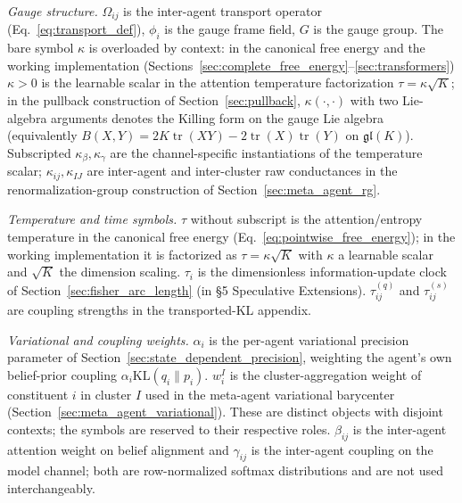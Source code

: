\documentclass[11pt]{article}
\begin{document}
\emph{Gauge structure.} $\Omega_{ij}$ is the inter-agent transport operator (Eq.~\ref{eq:transport_def}), $\phi_i$ is the gauge frame field, $G$ is the gauge group. The bare symbol $\kappa$ is overloaded by context: in the canonical free energy and the working implementation (Sections~\ref{sec:complete_free_energy}--\ref{sec:transformers}) $\kappa > 0$ is the learnable scalar in the attention temperature factorization $\tau = \kappa\sqrt{K}$; in the pullback construction of Section~\ref{sec:pullback}, $\kappa(\cdot,\cdot)$ with two Lie-algebra arguments denotes the Killing form on the gauge Lie algebra (equivalently $B(X,Y) = 2K\operatorname{tr}(XY) - 2\operatorname{tr}(X)\operatorname{tr}(Y)$ on $\mathfrak{gl}(K)$). Subscripted $\kappa_\beta, \kappa_\gamma$ are the channel-specific instantiations of the temperature scalar; $\kappa_{ij}, \kappa_{IJ}$ are inter-agent and inter-cluster raw conductances in the renormalization-group construction of Section~\ref{sec:meta_agent_rg}.

\emph{Temperature and time symbols.} $\tau$ without subscript is the attention/entropy temperature in the canonical free energy (Eq.~\ref{eq:pointwise_free_energy}); in the working implementation it is factorized as $\tau = \kappa \sqrt{K}$ with $\kappa$ a learnable scalar and $\sqrt{K}$ the dimension scaling. $\tau_i$ is the dimensionless information-update clock of Section~\ref{sec:fisher_arc_length} (in §5 Speculative Extensions). $\tau^{(q)}_{ij}$ and $\tau^{(s)}_{ij}$ are coupling strengths in the transported-KL appendix.

\emph{Variational and coupling weights.} $\alpha_i$ is the per-agent variational precision parameter of Section~\ref{sec:state_dependent_precision}, weighting the agent's own belief-prior coupling $\alpha_i \mathrm{KL}(q_i \| p_i)$. $w_i^I$ is the cluster-aggregation weight of constituent $i$ in cluster $I$ used in the meta-agent variational barycenter (Section~\ref{sec:meta_agent_variational}). These are distinct objects with disjoint contexts; the symbols are reserved to their respective roles. $\beta_{ij}$ is the inter-agent attention weight on belief alignment and $\gamma_{ij}$ is the inter-agent coupling on the model channel; both are row-normalized softmax distributions and are not used interchangeably.
\end{document}

